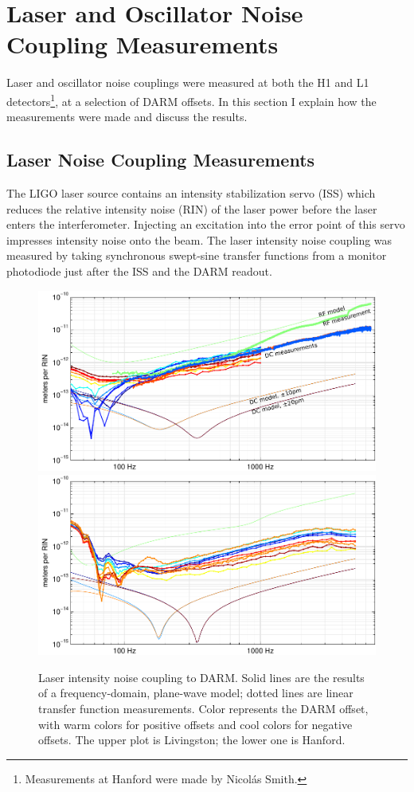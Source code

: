 \section{Laser and Oscillator Noise Coupling Measurements}

Laser and oscillator noise couplings were measured at both the H1 and
L1 detectors\footnote{Measurements at Hanford were made by Nicol\'as
  Smith.}, at a selection of DARM offsets.  In this section I explain
how the measurements were made and discuss the results.

\subsection{Laser Noise Coupling Measurements}

The LIGO laser source contains an intensity stabilization servo (ISS)
which reduces the relative intensity noise (RIN) of the laser power
before the laser enters the interferometer.  Injecting an excitation
into the error point of this servo impresses intensity noise onto the
beam.  The laser intensity noise coupling was measured by taking
synchronous swept-sine transfer functions from a monitor photodiode
just after the ISS and the DARM readout.

\begin{figure}[]   %
\includegraphics[]{figures/laserAM-L1.pdf}
\includegraphics[]{figures/laserAM-H1.pdf}
\caption[Laser intensity noise coupling (measured and modeled)]{Laser intensity noise coupling to DARM.
  Solid lines are the results of a frequency-domain, plane-wave model; dotted lines are linear transfer function measurements.  Color represents the DARM offset, with warm colors for positive offsets and cool colors for negative offsets.  The upper plot is Livingston; the lower one is Hanford.}
\end{figure}

